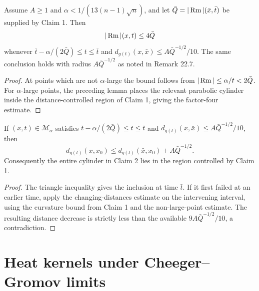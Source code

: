 \begin{claim}
\label{clm:chow-iii-point-picking-claim-two}


Assume \(A\ge1\) and \(\alpha<1/(13(n-1)\sqrt n)\), and let
\(\bar Q=|\operatorname{Rm}|(\bar x,\bar t)\) be supplied by Claim 1.  Then
\[
 |\operatorname{Rm}|(x,t)\le4\bar Q
\]
whenever \(\bar t-\alpha/(2\bar Q)\le t\le\bar t\) and
\(d_{g(t)}(x,\bar x)\le A\bar Q^{-1/2}/10\).  The same conclusion holds
with radius \(A\bar Q^{-1/2}\) as noted in Remark 22.7.
\end{claim}
\begin{proof}
\sketch At points which are not \(\alpha\)-large the bound follows from
\(|\operatorname{Rm}|\le\alpha/t<2\bar Q\).  For \(\alpha\)-large points, the preceding
lemma places the relevant parabolic cylinder inside the distance-controlled
region of Claim 1, giving the factor-four estimate.
\end{proof}

\begin{lemma}
\label{lem:chow-iii-point-picking-local-cylinder}


If \((x,t)\in\mathcal M_\alpha\) satisfies
\(\bar t-\alpha/(2\bar Q)\le t\le\bar t\) and
\(d_{g(t)}(x,\bar x)\le A\bar Q^{-1/2}/10\), then
\[
 d_{g(t)}(x,x_0)\le d_{g(t)}(\bar x,x_0)+A\bar Q^{-1/2}.
\]
Consequently the entire cylinder in Claim 2 lies in the region controlled by
Claim 1.
\end{lemma}
\begin{proof}
\sketch The triangle inequality gives the inclusion at time \(\bar t\).  If it first
failed at an earlier time, apply the changing-distances estimate on the
intervening interval, using the curvature bound from Claim 1 and the
non-large-point estimate.  The resulting distance decrease is strictly less
than the available \(9A\bar Q^{-1/2}/10\), a contradiction.
\end{proof}

\section{Heat kernels under Cheeger--Gromov limits}

